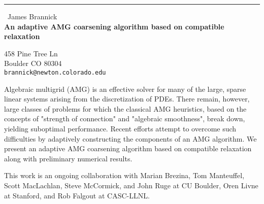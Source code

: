 \documentclass{report}
\begin{document}
\begin{center}
\rule{6in}{1pt} \
{\large James Brannick \\
{\bf An adaptive AMG coarsening algorithm based on compatible relaxation}}

458 Pine Tree Ln  \\ Boulder CO 80304
\\
{\tt brannick@newton.colorado.edu}\end{center}

Algebraic multigrid (AMG) is an effective solver for many of the large,
sparse linear systems arising from the discretization of PDEs. There
remain, however, large classes of problems for which the classical AMG
heuristics, based on the concepts of "strength of connection" and
"algebraic smoothness", break down, yielding suboptimal performance.
Recent efforts attempt to overcome such difficulties by adaptively
constructing the components of an AMG algorithm. We present an adaptive
AMG coarsening algorithm based on compatible relaxation along with
preliminary numerical results.

This work is an ongoing collaboration with Marian Brezina, Tom
Manteuffel, Scott MacLachlan, Steve McCormick, and John Ruge at CU
Boulder, Oren Livne at Stanford, and Rob Falgout at CASC-LLNL.
\end{document}

